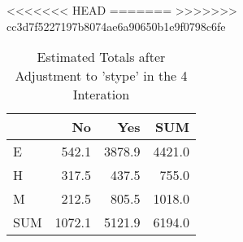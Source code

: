 <<<<<<< HEAD
=======
>>>>>>> cc3d7f5227197b8074ae6a90650b1e9f0798c6fe
\begin{table}[ht]
\centering
\caption{Estimated Totals after Adjustment to 'stype' in the 4 Interation} 
\begin{tabular}{l|rr|r}
  & No & Yes & SUM \\ 
  \hline
E & 542.1 & 3878.9 & 4421.0 \\ 
  H & 317.5 & 437.5 & 755.0 \\ 
  M & 212.5 & 805.5 & 1018.0 \\ 
   \hline
SUM & 1072.1 & 5121.9 & 6194.0 \\ 
  \end{tabular}
\end{table}
